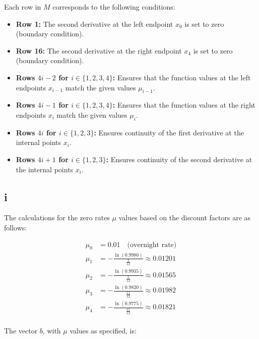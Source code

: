 \documentclass{article}
\begin{document}
Each row in \( M \) corresponds to the following conditions:

\begin{itemize}
    \item \textbf{Row 1:} The second derivative at the left endpoint \( x_0 \) is set to zero (boundary condition).
    \item \textbf{Row 16:} The second derivative at the right endpoint \( x_4 \) is set to zero (boundary condition).
    \item \textbf{Rows \( 4i - 2 \) for \( i \in \{1, 2, 3, 4\} \):} Ensures that the function values at the left endpoints \( x_{i-1} \) match the given values \( \mu_{i-1} \).
    \item \textbf{Rows \( 4i - 1 \) for \( i \in \{1, 2, 3, 4\} \):} Ensures that the function values at the right endpoints \( x_i \) match the given values \( \mu_i \).
    \item \textbf{Rows \( 4i \) for \( i \in \{1, 2, 3\} \):} Ensures continuity of the first derivative at the internal points \( x_i \).
    \item \textbf{Rows \( 4i + 1 \) for \( i \in \{1, 2, 3\} \):} Ensures continuity of the second derivative at the internal points \( x_i \).
\end{itemize}

\subsection*{i}

The calculations for the zero rates \( \mu \) values based on the discount factors are as follows:

\begin{align*}
    \mu_0 & = 0.01 \quad \text{(overnight rate)}                 \\
    \mu_1 & = -\frac{\ln(0.9980)}{\frac{2}{12}} \approx 0.01201  \\
    \mu_2 & = -\frac{\ln(0.9935)}{\frac{5}{12}} \approx 0.01565  \\
    \mu_3 & = -\frac{\ln(0.9820)}{\frac{11}{12}} \approx 0.01982 \\
    \mu_4 & = -\frac{\ln(0.9775)}{\frac{15}{12}} \approx 0.01821 \\
\end{align*}

The vector \( b \), with \(\mu\) values as specified, is:
\end{document}
